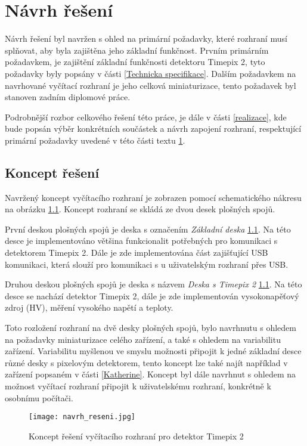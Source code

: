 \chapter{Návrh řešení} %
\label{Koncept reseni}
Návrh řešení byl navržen s ohled na primární požadavky, které rozhraní musí splňovat, aby byla zajištěna jeho základní funkčnost. Prvním primárním požadavkem, je zajištění základní funkčnosti detektoru Timepix 2, tyto požadavky byly popsány v části \ref{Technicka specifikace}. Dalším požadavkem na navrhované vyčítací rozhraní je jeho celková miniaturizace, tento požadavek byl stanoven zadním diplomové práce.
\par Podrobnější rozbor celkového řešení této práce, je dále v části \ref{realizace}, kde bude popsán výběr konkrétních součástek a návrh zapojení rozhraní, respektující primární požadavky uvedené v této části textu \ref{Koncept reseni}.

\section{Koncept řešení}
Navržený koncept vyčítacího rozhraní je zobrazen pomocí schematického nákresu na obrázku \ref{fig:navrh_reseni}. Koncept rozhraní se skládá ze dvou desek plošných spojů. 
\par První deskou plošných spojů je deska s označením \textit{Základní deska} \ref{fig:navrh_reseni}. Na této desce je implementováno většina funkcionalit potřebných pro komunikaci s detektorem Timepix 2. Dále je zde implementována část zajišťující USB komunikaci, která slouží pro komunikaci s u uživatelským rozhraní přes USB.
\par Druhou deskou plošných spojů je deska s názvem \textit{Deska s Timepix 2} \ref{fig:navrh_reseni}. Na této desce se nachází detektor Timepix 2, dále je zde implementován vysokonapěťový zdroj (HV), měření vysokého napětí a teploty.
\par Toto rozložení rozhraní na dvě desky plošných spojů, bylo navrhnutu s ohledem na požadavky miniaturizace celého zařízení, a také s ohledem na variabilitu zařízení. Variabilitu myšlenou ve smyslu možnosti připojit k jedné základní desce různé desky s pixelovým detektorem, tento koncept lze také najít například v zařízení popsaném v části \ref{Katherine}. Koncept byl dále navrhnut s ohledem na možnost vyčítací rozhraní připojit k uživatelskému rozhraní, konkrétně k osobnímu počítači.  
\begin{figure}[h!]
	\centering
	\captionsetup{justification=centering}
	\texttt{[image: navrh\_reseni.jpg]}
	\caption{Koncept řešení vyčítacího rozhraní pro detektor Timepix 2} 
	\label{fig:navrh_reseni}
\end{figure}

